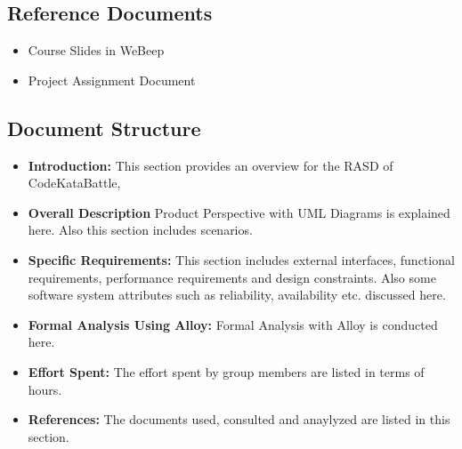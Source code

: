 \subsection{Reference Documents}
\begin{itemize}
    \item Course Slides in WeBeep
    \item Project Assignment Document
\end{itemize}
\subsection{Document Structure}

\begin{itemize}
    \item \textbf{Introduction:} This section provides an overview for the RASD of CodeKataBattle,
    \item \textbf{Overall Description} Product Perspective with UML Diagrams is explained here. Also this section includes scenarios.
    \item \textbf{Specific Requirements:} 
    This section includes external interfaces, functional requirements, performance requirements and design constraints. Also some software system attributes such as reliability, availability etc. discussed here.
    \item \textbf{Formal Analysis Using Alloy:} Formal Analysis with Alloy is conducted here.
    \item \textbf{Effort Spent:} The effort spent by group members are listed in terms of hours.
    \item \textbf{References:} The documents used, consulted and anaylyzed are listed in this section.
\end{itemize}
